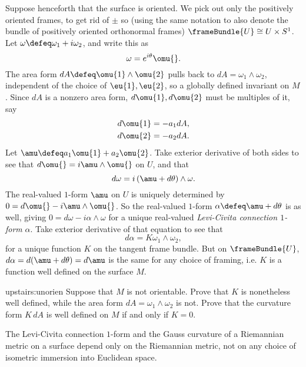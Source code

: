 Suppose henceforth that the surface is oriented.
We pick out only the positively oriented frames, to get rid of \(\pm\) so (using the same notation to also denote the bundle of positively oriented orthonormal frames) \(\frameBundle{U}\cong U\times S^1\).
Let \(\omega\defeq\omega_1+i\omega_2\), and write this as
\[
\omega=e^{i\theta}\omu{}.
\]
The area form \(dA\defeq \omu{1}\wedge\omu{2}\) pulls back to \(dA=\omega_1\wedge\omega_2\), independent of the choice of \(\eu{1},\eu{2}\), so a globally defined invariant on \(M\).
Since \(dA\) is a nonzero area form, \(d\omu{1},d\omu{2}\) must be multiples of it, say
\begin{align*}
d\omu{1}&=-a_1dA,\\
d\omu{2}&=-a_2dA.
\end{align*}
Let \(\amu\defeq a_1\omu{1}+a_2\omu{2}\).
Take exterior derivative of both sides to see that \(d\omu{}=i\amu\wedge\omu{}\) on \(U\), and that
\[
d\omega=i \, (\amu+d\theta) \wedge \omega.
\]
The real-valued \(1\)-form  \(\amu\) on \(U\) is uniquely determined by \(0=d\omu{}-i\amu\wedge\omu{}\).
So the real-valued \(1\)-form \(\alpha\defeq\amu+d\theta\) is as well, giving \(0=d\omega-i\alpha\wedge\omega\) for a unique real-valued \emph{Levi-Civita connection \(1\)-form} \(\alpha\).
Take exterior derivative of that equation to see that
\[
d\alpha=K\omega_1\wedge\omega_2,
\]
for a unique function \(K\) on the tangent frame bundle.
But on \(\frameBundle{U}\), \(d\alpha=d(\amu+d\theta)=d\amu\) is the same for any choice of framing, i.e. \(K\) is a function well defined on the surface \(M\).
\begin{problem}{upstairs:unorien}
Suppose that \(M\) is not orientable.
Prove that \(K\) is nonetheless well defined, while the area form \(dA=\omega_1\wedge\omega_2\) is not.
Prove that the curvature form \(K \, dA\) is well defined on \(M\) if and only if \(K=0\).
\end{problem}
\begin{theorem}
The Levi-Civita connection \(1\)-form and the Gauss curvature of a Riemannian metric on a surface depend only on the Riemannian metric, not on any choice of isometric immersion into Euclidean space.
\end{theorem}

